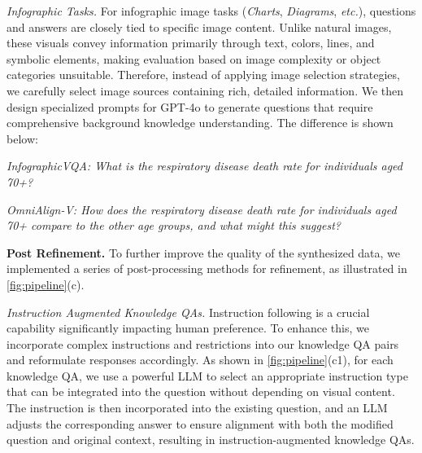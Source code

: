 \textit{Infographic Tasks. }
For infographic image tasks (\textit{Charts}, \textit{Diagrams}, \emph{etc.}), 
questions and answers are closely tied to specific image content. 
Unlike natural images, these visuals convey information primarily through text, colors, lines, and symbolic elements, 
making evaluation based on image complexity or object categories unsuitable. Therefore, instead of applying image selection strategies, 
we carefully select image sources containing rich, detailed information. 
We then design specialized prompts for GPT-4o to generate questions that require comprehensive background knowledge understanding. The difference is shown below:

\noindent\textit{InfographicVQA: What is the respiratory disease death rate for individuals aged 70+? }

\noindent\textit{OmniAlign-V: How does the respiratory disease death rate for individuals aged 70+ compare to the other age groups, and what might this suggest?}



\noindent\textbf{Post Refinement. } 
To further improve the quality of the synthesized data, 
 we implemented a series of post-processing methods for refinement,
as illustrated in \cref{fig:pipeline}(c).

\textit{Instruction Augmented Knowledge QAs. }
Instruction following is a crucial capability significantly impacting human preference. 
To enhance this, we incorporate complex instructions and restrictions into our knowledge QA pairs and reformulate responses accordingly. 
As shown in \cref{fig:pipeline}(c1), for each knowledge QA, 
we use a powerful LLM to select an appropriate instruction type that can be integrated into the question without depending on visual content. 
The instruction is then incorporated into the existing question, and an LLM adjusts the corresponding answer to ensure alignment with both the modified question and original context, resulting in instruction-augmented knowledge QAs.


